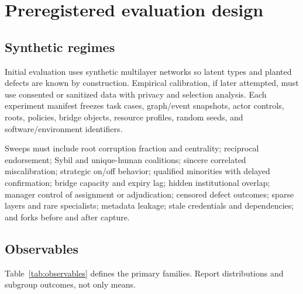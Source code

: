 \documentclass[11pt]{article}
\begin{document}
\section{Preregistered evaluation design}

\subsection{Synthetic regimes}

Initial evaluation uses synthetic multilayer networks so latent types and planted defects are known by construction.  Empirical calibration, if later attempted, must use consented or sanitized data with privacy and selection analysis.  Each experiment manifest freezes task cases, graph/event snapshots, actor controls, roots, policies, bridge objects, resource profiles, random seeds, and software/environment identifiers.

Sweeps must include root corruption fraction and centrality; reciprocal endorsement; Sybil and unique-human coalitions; sincere correlated miscalibration; strategic on/off behavior; qualified minorities with delayed confirmation; bridge capacity and expiry lag; hidden institutional overlap; manager control of assignment or adjudication; censored defect outcomes; sparse layers and rare specialists; metadata leakage; stale credentials and dependencies; and forks before and after capture.

\subsection{Observables}

Table~\ref{tab:observables} defines the primary families.  Report distributions and subgroup outcomes, not only means.
\end{document}
